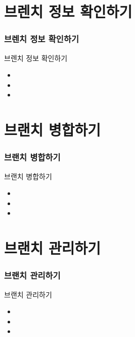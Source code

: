 \documentclass[aspectratio=1610,20pt,xcolor=pdftex,dvipsnames,table,handout]{beamer}
\begin{document}
		\section{ 브렌치 정보 확인하기}

		\begin{frame} [t,plain]
		\frametitle{브렌치 정보 확인하기 }
			\begin{block} {브렌치 정보 확인하기 }
			\setlength{\leftmargini}{1em}			
			\begin{itemize}
				\item 	
				\item 	
				\item 	
			\end{itemize}
			\end{block}						
		\end{frame}						

		\section{ 브랜치 병합하기}

		\begin{frame} [t,plain]
		\frametitle{브랜치 병합하기 }
			\begin{block} {브랜치 병합하기 }
			\setlength{\leftmargini}{1em}			
			\begin{itemize}
				\item 	
				\item 	
				\item 	
			\end{itemize}
			\end{block}						
		\end{frame}						

		\section{ 브랜치 관리하기}

		\begin{frame} [t,plain]
		\frametitle{브랜치 관리하기 }
			\begin{block} { 브랜치 관리하기}
			\setlength{\leftmargini}{1em}			
			\begin{itemize}
				\item 	
				\item 	
				\item 	
			\end{itemize}
			\end{block}						
		\end{frame}						
\end{document}
